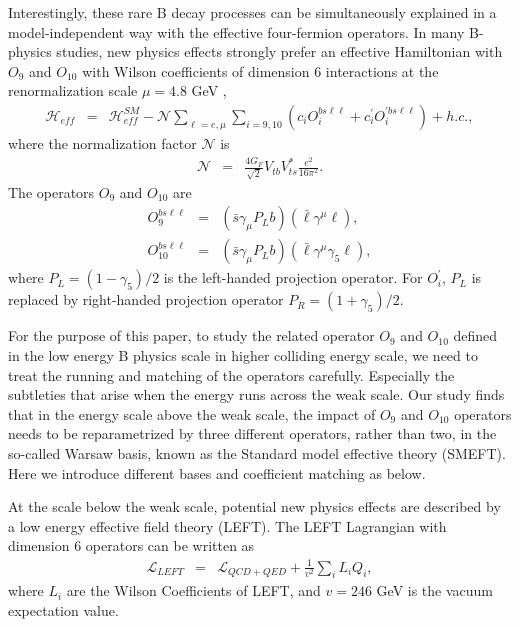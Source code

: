 \documentclass[a4paper,11pt]{article}
\begin{document}
Interestingly, these rare B decay processes can be simultaneously explained in a model-independent way with the effective four-fermion operators. 
In many B-physics studies,  new physics effects strongly prefer an effective Hamiltonian with $O_9 $ and $O_{10}$ with Wilson coefficients of dimension 6 interactions at the renormalization scale $\mu =4.8$ GeV ,
\begin{eqnarray}
  \mathcal{H}_{eff} &=& \mathcal{H}^{SM}_{eff}-\mathcal{N}\sum_{\ell=e,\mu}\sum_{i=9,10}\left(c_iO^{bs\ell\ell}_i+c^\prime_i O^{\prime bs\ell\ell}_i\right) + h.c., 
\end{eqnarray} 
where the normalization factor $\mathcal{N}$ is 
\begin{eqnarray}
  \mathcal{N} &=& \frac{4G_F}{\sqrt{2}}V_{tb}V^*_{ts}\frac{e^2}{16\pi^2}. 
\end{eqnarray}
The operators $O_9$ and $O_{10}$ are 
\begin{eqnarray}
   O^{bs\ell\ell}_9 &=& (\bar{s}\gamma_\mu P_L b)(\bar{\ell}\gamma^{\mu}\ell),  \\
   O^{bs\ell\ell}_{10} &=& (\bar{s}\gamma_\mu P_L b)(\bar{\ell}\gamma^{\mu}\gamma_5\ell),
\end{eqnarray}
where $P_L=(1-\gamma_5)/2$ is the left-handed projection operator. 
For $O^\prime_i$, $P_L$ is replaced by right-handed projection operator $P_R=(1+\gamma_5)/2$.

For the purpose of this paper, to study the related operator $O_9$ and $O_{10}$ defined in the low energy B physics scale in higher colliding energy scale, 
we need to treat the running and matching of the operators carefully. 
Especially the subtleties that arise when the energy runs across the weak scale. 
Our study finds that in the energy scale above the weak scale, 
the impact of $O_9$ and $O_{10}$ operators needs to be reparametrized by three different operators, 
rather than two, in the so-called Warsaw basis, known as the Standard model effective theory (SMEFT). 
Here we introduce different bases and coefficient matching as below. 

At the scale below the weak scale, potential new physics effects are described by a low energy effective field theory (LEFT).  
The LEFT Lagrangian with dimension 6 operators can be written as 
\begin{eqnarray}
  \mathcal{L}_{LEFT} &=& \mathcal{L}_{QCD+QED}+ \frac{1}{v^2}\sum_{i}L_iQ_i,  \nonumber 
\end{eqnarray} 
where $L_i$ are the Wilson Coefficients of LEFT, and $v=246$ GeV is the vacuum expectation value. 
\end{document}
